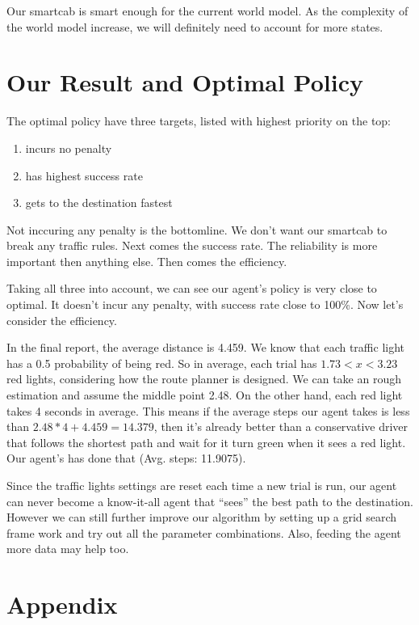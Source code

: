\documentclass{article}
\providecommand{\tightlist}{%
      \setlength{\itemsep}{0pt}\setlength{\parskip}{0pt}}
\begin{document}
Our smartcab is smart enough for the current world model. As the
complexity of the world model increase, we will definitely need to
account for more states.

\section{Our Result and Optimal
Policy}\label{our-result-and-optimal-policy}

The optimal policy have three targets, listed with highest priority on
the top:

\begin{enumerate}
\def\labelenumi{\arabic{enumi}.}
\tightlist
\item
  incurs no penalty
\item
  has highest success rate
\item
  gets to the destination fastest
\end{enumerate}

Not inccuring any penalty is the bottomline. We don't want our smartcab
to break any traffic rules. Next comes the success rate. The reliability
is more important then anything else. Then comes the efficiency.

Taking all three into account, we can see our agent's policy is very
close to optimal. It doesn't incur any penalty, with success rate close
to 100\%. Now let's consider the efficiency.

In the final report, the average distance is 4.459. We know that each
traffic light has a 0.5 probability of being red. So in average, each
trial has \(1.73 < x < 3.23\) red lights, considering how the route
planner is designed. We can take an rough estimation and assume the
middle point 2.48. On the other hand, each red light takes 4 seconds in
average. This means if the average steps our agent takes is less than
\(2.48 * 4 + 4.459 = 14.379\), then it's already better than a
conservative driver that follows the shortest path and wait for it turn
green when it sees a red light. Our agent's has done that (Avg. steps:
11.9075).

Since the traffic lights settings are reset each time a new trial is
run, our agent can never become a know-it-all agent that ``sees'' the
best path to the destination. However we can still further improve our
algorithm by setting up a grid search frame work and try out all the
parameter combinations. Also, feeding the agent more data may help too.

    \section{Appendix}\label{appendix}
\end{document}
